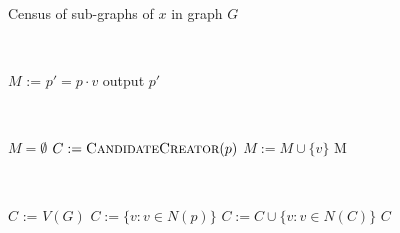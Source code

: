 \documentclass[12pt,twoside]{reedthesis}
\begin{document}
\begin{algorithm}
\caption{Census of sub-graphs of $x$ in graph $G$}
\label{alg:seq}

\begin{algorithmic}[1]
        \State {}
    \EndFor
\EndProcedure
\end{algorithmic}
\ \vspace{0.25in}

\begin{algorithmic}[1]
\State $M$ := 
    \State $p' = p \cdot v$
        \State output $p'$  
    \EndIf
        \State {}
    \EndFor
\EndFor
\EndProcedure
\end{algorithmic}
\ \vspace{0.25in}

\begin{algorithmic}[1]
\State $M = \emptyset$
\State $C := \Call{CandidateCreator}{p}$
        \State $M := M \cup \{v\}$
    \EndIf
\EndFor
\State \Return M
\EndFunction
\end{algorithmic}
\ \vspace{0.25in}

\begin{algorithmic}[1]
    \State $C$ := $V(G)$
\Else
    \State $C := \{v : v \in N{(p)}\}$
    \State $C := C \cup \{v : v \in N{(C)}\}$
    \State \Return $C$
    
\EndIf
\EndFunction
\end{algorithmic}

\end{algorithm}
\end{document}
